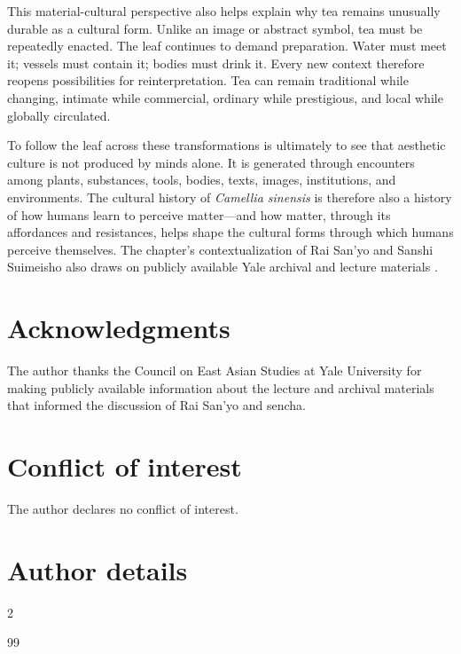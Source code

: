 \documentclass[numbers]{IntechOpen-Book}
\newcommand{\zh}[1]{{\CJKfontspec{Noto Serif CJK SC}\upshape #1}}
\begin{document}
\begin{backmatter}
This material-cultural perspective also helps explain why tea remains unusually durable as a cultural form. Unlike an image or abstract symbol, tea must be repeatedly enacted. The leaf continues to demand preparation. Water must meet it; vessels must contain it; bodies must drink it. Every new context therefore reopens possibilities for reinterpretation. Tea can remain traditional while changing, intimate while commercial, ordinary while prestigious, and local while globally circulated.

To follow the leaf across these transformations is ultimately to see that aesthetic culture is not produced by minds alone. It is generated through encounters among plants, substances, tools, bodies, texts, images, institutions, and environments. The cultural history of \textit{Camellia sinensis} is therefore also a history of how humans learn to perceive matter---and how matter, through its affordances and resistances, helps shape the cultural forms through which humans perceive themselves. The chapter's contextualization of Rai San'yo and Sanshi Suimeisho also draws on publicly available Yale archival and lecture materials \cite{yale}.

\section*{Acknowledgments}
The author thanks the Council on East Asian Studies at Yale University for making publicly available information about the lecture and archival materials that informed the discussion of Rai San'yo and sencha.

\section*{Conflict of interest}
The author declares no conflict of interest.

\section*{Author details}
\begin{authordetails}
\author{Vivien Jiaqian Zhu (\zh{朱嘉倩})}
\address[1]{Stanford University, Stanford, California, United States}
\address{*Address all correspondence to: jvzhu@stanford.edu}
\end{authordetails}

\begin{multicols}{2}
\begin{thebibliography}{99}


\end{thebibliography}
\end{multicols}
\end{backmatter}
\end{document}
